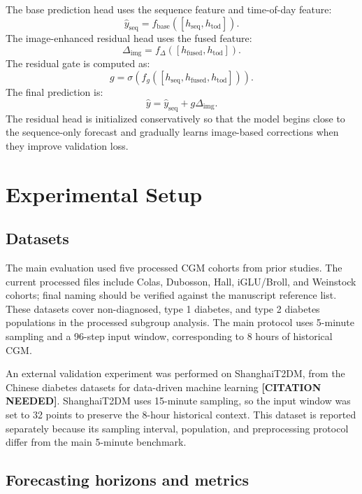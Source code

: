 \documentclass[11pt]{article}
\begin{document}
The base prediction head uses the sequence feature and time-of-day feature:
\begin{equation}
\hat{y}_{\mathrm{seq}} = f_{\mathrm{base}}([h_{\mathrm{seq}}, h_{\mathrm{tod}}]).
\end{equation}
The image-enhanced residual head uses the fused feature:
\begin{equation}
\Delta_{\mathrm{img}} = f_{\Delta}([h_{\mathrm{fused}}, h_{\mathrm{tod}}]).
\end{equation}
The residual gate is computed as:
\begin{equation}
g = \sigma(f_g([h_{\mathrm{seq}}, h_{\mathrm{fused}}, h_{\mathrm{tod}}])).
\end{equation}
The final prediction is:
\begin{equation}
\hat{y} = \hat{y}_{\mathrm{seq}} + g \Delta_{\mathrm{img}}.
\end{equation}
The residual head is initialized conservatively so that the model begins close to the sequence-only forecast and gradually learns image-based corrections when they improve validation loss.

\section{Experimental Setup}

\subsection{Datasets}

The main evaluation used five processed CGM cohorts from prior studies. The current processed files include Colas, Dubosson, Hall, iGLU/Broll, and Weinstock cohorts; final naming should be verified against the manuscript reference list. These datasets cover non-diagnosed, type 1 diabetes, and type 2 diabetes populations in the processed subgroup analysis. The main protocol uses 5-minute sampling and a 96-step input window, corresponding to 8 hours of historical CGM.

An external validation experiment was performed on ShanghaiT2DM, from the Chinese diabetes datasets for data-driven machine learning \textbf{[CITATION NEEDED]}. ShanghaiT2DM uses 15-minute sampling, so the input window was set to 32 points to preserve the 8-hour historical context. This dataset is reported separately because its sampling interval, population, and preprocessing protocol differ from the main 5-minute benchmark.

\subsection{Forecasting horizons and metrics}
\end{document}
